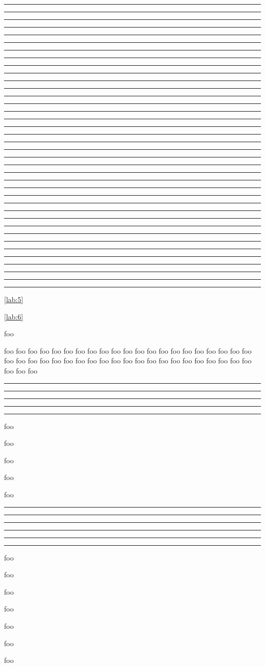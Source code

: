 \documentclass[UTF8,hyperref]{ctexart}
\def\testitem{\item\rule{\ecolswidth}{1pt}}
\begin{document}
\begin{enumcols}[3]
\testitem
\testitem
\testitem
\testitem
\testitem
\testitem
\testitem
\testitem
\testitem
\testitem
\testitem
\testitem
\testitem
\testitem
\testitem
\testitem
\testitem
\testitem
\testitem
\testitem
\end{enumcols}
\begin{enumcols}[6,adjust=false]
\testitem
\testitem
\testitem
\testitem
\testitem
\testitem
\testitem
\testitem
\testitem
\testitem
\testitem
\testitem
\testitem
\testitem
\testitem
\testitem
\testitem
\testitem
\end{enumcols}


\begin{enumlist}
\item\label{lab:1}
\item\label{lab:2}
\item\label{lab:3}
\item\label{lab:4}
\begin{enumcols}[counter=enumlist,format=\bfseries,label=(\arabic*),ref=(\Roman*)]
\item \label{lab:5}\ref{lab:5}
\item \label{lab:6}\ref{lab:6}
\item \label{lab:7}
\item foo
\item foo foo foo foo foo foo foo foo foo foo foo foo foo
      foo foo foo foo foo foo foo foo foo foo foo foo foo
      foo foo foo foo foo foo foo foo foo foo foo foo foo
      foo foo foo foo foo foo
\testitem
\testitem
\item\lipsum[1-5]
\testitem
\testitem
\testitem
\item\lipsum[6-10]
\item foo
\end{enumcols}
\item \label{lab:8}
\item \label{lab:9}
\item foo
\item foo
\item foo
\begin{enumcols}[counter=enumlist,format=\bfseries,label=(\arabic*)]
\item \label{lab:15}
\item \label{lab:16}
\item \label{lab:17}
\item foo
\testitem
\testitem
\testitem
\testitem
\testitem
\testitem
\item foo
\end{enumcols}
\item foo
\item foo
\item foo
\item foo
\item foo
\item foo
\end{enumlist}
\end{document}
